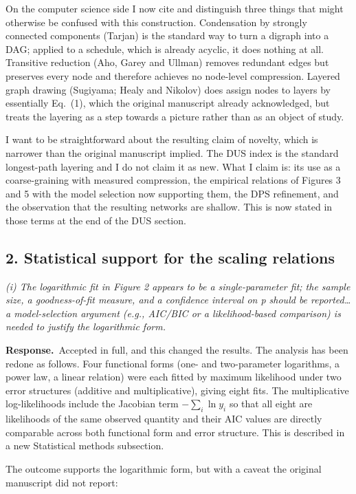 \documentclass[11pt,a4paper]{article}
\newcommand{\rev}[1]{\medskip\noindent\textit{#1}\par\medskip}
\newcommand{\reply}{\noindent\textbf{Response.}\ }
\begin{document}
On the computer science side I now cite and distinguish three things that might
otherwise be confused with this construction. Condensation by strongly connected
components (Tarjan) is the standard way to turn a digraph into a DAG; applied to
a schedule, which is already acyclic, it does nothing at all. Transitive
reduction (Aho, Garey and Ullman) removes redundant edges but preserves every
node and therefore achieves no node-level compression. Layered graph drawing
(Sugiyama; Healy and Nikolov) does assign nodes to layers by essentially
Eq.~(1), which the original manuscript already acknowledged, but treats the
layering as a step towards a picture rather than as an object of study.

I want to be straightforward about the resulting claim of novelty, which is
narrower than the original manuscript implied. The DUS index is the standard
longest-path layering and I do not claim it as new. What I claim is: its use as
a coarse-graining with measured compression, the empirical relations of Figures
3 and 5 with the model selection now supporting them, the DPS refinement, and
the observation that the resulting networks are shallow. This is now stated in
those terms at the end of the DUS section.

\subsection*{2. Statistical support for the scaling relations}

\rev{(i) The logarithmic fit in Figure 2 appears to be a single-parameter fit;
the sample size, a goodness-of-fit measure, and a confidence interval on p should
be reported\ldots{} a model-selection argument (e.g., AIC/BIC or a likelihood-based
comparison) is needed to justify the logarithmic form.}

\reply Accepted in full, and this changed the results. The analysis has been
redone as follows. Four functional forms (one- and two-parameter logarithms, a
power law, a linear relation) were each fitted by maximum likelihood under two
error structures (additive and multiplicative), giving eight fits. The
multiplicative log-likelihoods include the Jacobian term $-\sum_i \ln y_i$ so
that all eight are likelihoods of the same observed quantity and their AIC
values are directly comparable across both functional form and error structure.
This is described in a new Statistical methods subsection.

The outcome supports the logarithmic form, but with a caveat the original
manuscript did not report:
\end{document}
